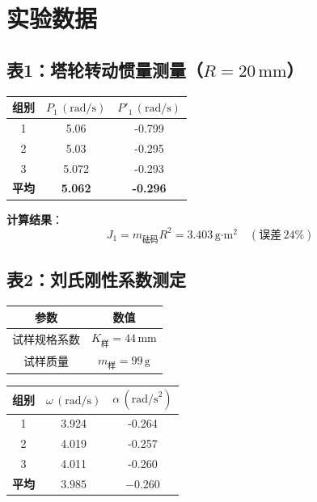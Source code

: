 \documentclass[12pt,a4paper]{article}
\begin{document}
\section{实验数据}
\subsection{表1：塔轮转动惯量测量（$R=20\,\text{mm}$）}
\begin{table}[H]
\centering
\begin{tabular}{|c|c|c|}
\hline
组别 & $P_1\,(\text{rad/s})$ & $P'_1\,(\text{rad/s})$ \\
\hline
1 & 5.06 & -0.799 \\
\hline
2 & 5.03 & -0.295 \\
\hline
3 & 5.072 & -0.293 \\
\hline
\textbf{平均} & \textbf{5.062} & \textbf{-0.296} \\
\hline
\end{tabular}
\end{table}

\textbf{计算结果}：
\begin{equation}
J_1 = m_{\text{砝码}}R^2 = 3.403\,\text{g·m}^2 \quad (\text{误差}\,24\%)
\end{equation}

\subsection{表2：刘氏刚性系数测定}
\begin{table}[H]
\centering
\begin{tabular}{|c|c|}
\hline
参数 & 数值 \\
\hline
试样规格系数 & $K_{\text{样}} = 44\,\text{mm}$ \\
\hline
试样质量 & $m_{\text{样}} = 99\,\text{g}$ \\
\hline
\end{tabular}
\end{table}

\begin{table}[H]
\centering
\begin{tabular}{|c|c|c|}
\hline
组别 & $\omega\,(\text{rad/s})$ & $\alpha\,(\text{rad/s}^2)$ \\
\hline
1 & 3.924 & -0.264 \\
\hline
2 & 4.019 & -0.257 \\
\hline
3 & 4.011 & -0.260 \\
\hline
\textbf{平均} & $3.985$ & $-0.260$ \\
\hline
\end{tabular}
\end{table}
\end{document}
